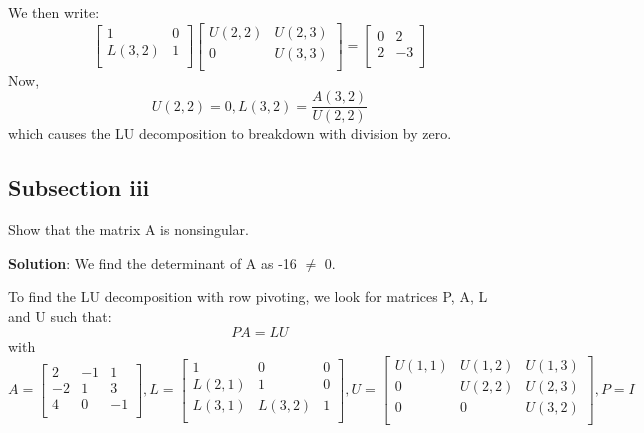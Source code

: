 \documentclass{article}
\DeclareMathOperator{\1}{\mathit{1}}
\numberwithin{figure}{section} %
\begin{document}
We then write:
    \[
        \begin{bmatrix}
            1 & 0 \\
            L(3,2) & 1 \\
        \end{bmatrix}
        \begin{bmatrix}
            U(2,2) & U(2,3) \\
            0 & U(3,3) \\
        \end{bmatrix} =
        \begin{bmatrix}
            0 & 2 \\
            2 & -3 \\
        \end{bmatrix}
    \]
Now,
    \[
        U(2,2) = 0, L(3,2) = \frac{A(3,2)}{U(2,2)}
    \]
which causes the LU decomposition to breakdown with division by zero.

\subsection{Subsection iii}
Show that the matrix A is nonsingular.

\textbf{Solution}: We find the determinant of A as -16 $\neq$ 0.

To find the LU decomposition with row pivoting, we look for matrices P, A, L and U such that:
    \[
        PA = LU
    \]
with
    \[
        A = 
        \begin{bmatrix}
            2 & -1 & 1 \\
            -2 & 1 & 3 \\
            4 & 0 & -1 \\
        \end{bmatrix},
        L=
        \begin{bmatrix}
            1 & 0 & 0 \\
            L(2,1) & 1 & 0 \\
            L(3,1) & L(3,2) & 1 \\
        \end{bmatrix},
        U =
        \begin{bmatrix}
            U(1,1) & U(1,2) & U(1,3) \\
            0 & U(2,2) & U(2,3) \\
            0 & 0 & U(3,2) \\
        \end{bmatrix},
        P = I
    \]
\end{document}
